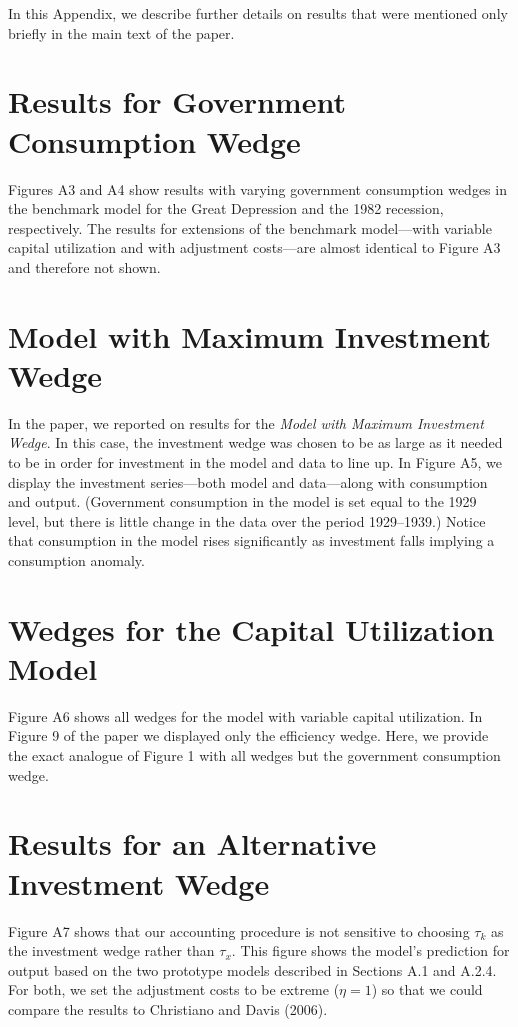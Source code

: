 

\noindent
In this Appendix, we describe further details on 
results that were mentioned only briefly in the main
text of the paper.

\section{Results for Government Consumption Wedge}

Figures A3 and A4 show results with varying
government consumption wedges in the benchmark model
for the Great Depression and the 1982 recession, respectively.
The results for extensions of the benchmark
model---with variable capital utilization and 
with adjustment costs---are almost identical
to Figure A3 and therefore not shown.

\section{Model with Maximum Investment Wedge}

In the paper, we reported on results for the {\it Model with Maximum
Investment Wedge}.  In this case, the investment
wedge was chosen to be as large as it needed to 
be in order for investment in the model and data
to line up.  In Figure A5, we display the investment
series---both model and data---along with consumption
and output.  (Government consumption in the model
is set equal to the 1929 level, but there is little
change in the data over the period 1929--1939.)
Notice that consumption in the model rises significantly
as investment falls implying a consumption anomaly.

\section{Wedges for the Capital Utilization Model}

Figure A6 shows all wedges for the model with 
variable capital utilization.  In Figure 9 of the 
paper we displayed only the efficiency wedge.
Here, we provide the exact analogue of Figure 1
with all wedges but the government consumption wedge.

\section{Results for an Alternative Investment Wedge}

Figure A7 shows that our accounting procedure is
not sensitive to choosing $\tau_k$ as the investment
wedge rather than $\tau_x$.  This figure shows the 
model's prediction for output based on the two prototype
models described in Sections A.1 and A.2.4.  
For both, we set the adjustment costs to 
be extreme ($\eta=1$) so that we could compare
the results to Christiano and Davis (2006).  

